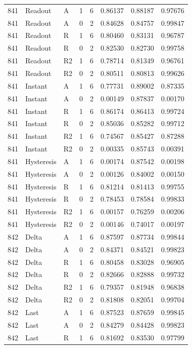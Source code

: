 \begin{longtable}{llllllll}
841 & Readout & A & 1 & 6 & 0.86137 & 0.88187 & 0.97676 \\
841 & Readout & A & 0 & 2 & 0.84628 & 0.84757 & 0.99847 \\
841 & Readout & R & 1 & 6 & 0.80460 & 0.83131 & 0.96787 \\
841 & Readout & R & 0 & 2 & 0.82530 & 0.82730 & 0.99758 \\
841 & Readout & R2 & 1 & 6 & 0.78714 & 0.81349 & 0.96761 \\
841 & Readout & R2 & 0 & 2 & 0.80511 & 0.80813 & 0.99626 \\
841 & Instant & A & 1 & 6 & 0.77731 & 0.89002 & 0.87335 \\
841 & Instant & A & 0 & 2 & 0.00149 & 0.87837 & 0.00170 \\
841 & Instant & R & 1 & 6 & 0.86174 & 0.86413 & 0.99724 \\
841 & Instant & R & 0 & 2 & 0.85036 & 0.85282 & 0.99712 \\
841 & Instant & R2 & 1 & 6 & 0.74567 & 0.85427 & 0.87288 \\
841 & Instant & R2 & 0 & 2 & 0.00335 & 0.85743 & 0.00391 \\
841 & Hysteresis & A & 1 & 6 & 0.00174 & 0.87542 & 0.00198 \\
841 & Hysteresis & A & 0 & 2 & 0.00126 & 0.84002 & 0.00150 \\
841 & Hysteresis & R & 1 & 6 & 0.81214 & 0.81413 & 0.99755 \\
841 & Hysteresis & R & 0 & 2 & 0.78453 & 0.78584 & 0.99833 \\
841 & Hysteresis & R2 & 1 & 6 & 0.00157 & 0.76259 & 0.00206 \\
841 & Hysteresis & R2 & 0 & 2 & 0.00146 & 0.74017 & 0.00197 \\
842 & Delta & A & 1 & 6 & 0.87597 & 0.87734 & 0.99844 \\
842 & Delta & A & 0 & 2 & 0.84371 & 0.84521 & 0.99823 \\
842 & Delta & R & 1 & 6 & 0.80458 & 0.83028 & 0.96905 \\
842 & Delta & R & 0 & 2 & 0.82666 & 0.82888 & 0.99732 \\
842 & Delta & R2 & 1 & 6 & 0.79357 & 0.81948 & 0.96838 \\
842 & Delta & R2 & 0 & 2 & 0.81808 & 0.82051 & 0.99704 \\
842 & Last & A & 1 & 6 & 0.87523 & 0.87659 & 0.99845 \\
842 & Last & A & 0 & 2 & 0.84279 & 0.84428 & 0.99823 \\
842 & Last & R & 1 & 6 & 0.81692 & 0.83530 & 0.97799 \\

\end{longtable}
